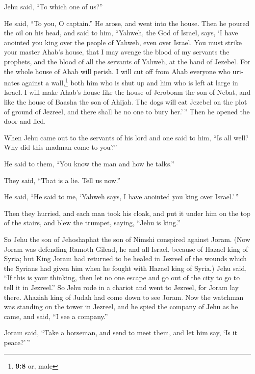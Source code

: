 \begin{paracol}{2}
\begin{otherlanguage}{english}
Jehu said, ``To which one of us?''

He said, ``To you, O captain.''  He arose, and went into
the house. Then he poured the oil on his head, and said to him,
``Yahweh, the God of Israel, says, `I have anointed you king over the
people of Yahweh, even over Israel.  You must strike your
master Ahab's house, that I may avenge the blood of my servants the
prophets, and the blood of all the servants of Yahweh, at the hand of
Jezebel.  For the whole house of Ahab will perish. I will
cut off from Ahab everyone who urinates against a wall,\footnote{\textbf{9:8}
  or, male} both him who is shut up and him who is left at large in
Israel.  I will make Ahab's house like the house of
Jeroboam the son of Nebat, and like the house of Baasha the son of
Ahijah.  The dogs will eat Jezebel on the plot of ground
of Jezreel, and there shall be no one to bury her.'\,'' Then he opened
the door and fled.

 When Jehu came out to the servants of his lord and one
said to him, ``Is all well? Why did this madman come to you?''

He said to them, ``You know the man and how he talks.''

 They said, ``That is a lie. Tell us now.''

He said, ``He said to me, `Yahweh says, I have anointed you king over
Israel.'\,''

 Then they hurried, and each man took his cloak, and put
it under him on the top of the stairs, and blew the trumpet, saying,
``Jehu is king.''

 So Jehu the son of Jehoshaphat the son of Nimshi
conspired against Joram. (Now Joram was defending Ramoth Gilead, he and
all Israel, because of Hazael king of Syria;  but King
Joram had returned to be healed in Jezreel of the wounds which the
Syrians had given him when he fought with Hazael king of Syria.) Jehu
said, ``If this is your thinking, then let no one escape and go out of
the city to go to tell it in Jezreel.''  So Jehu rode in
a chariot and went to Jezreel, for Joram lay there. Ahaziah king of
Judah had come down to see Joram.  Now the watchman was
standing on the tower in Jezreel, and he spied the company of Jehu as he
came, and said, ``I see a company.''

Joram said, ``Take a horseman, and send to meet them, and let him say,
`Is it peace?'\,''


\end{otherlanguage}
\end{paracol}
